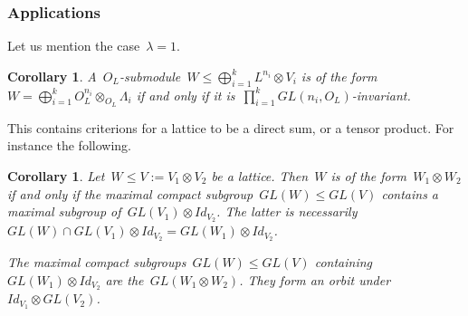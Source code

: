 \documentclass[12pt]{amsart}
\newtheorem{corollary}[theorem]{Corollary}
\newcommand{\tens}{\otimes}
\begin{document}
\subsubsection{Applications}
Let us mention the case~$\lambda=1$. 
\begin{corollary}
A~$O_L$-submodule~$W\leq \bigoplus_{i=1}^k L^{n_i}\tens V_i$ is of the form~$W=\bigoplus_{i=1}^k O_L^{n_i}\tens_{O_L} \Lambda_i$ if and only if it is~$\prod_{i=1}^kGL(n_i,O_{L})$-invariant.
\end{corollary}
This contains criterions for a lattice to be a direct sum, or a tensor product. For instance the following.
\begin{corollary}Let~$W\leq V:= V_1\tens V_2$ be a lattice. Then~$W$ is of the form~$W_1\tens W_2$ if and only if the maximal compact subgroup~$GL(W)\leq GL(V)$ contains a maximal subgroup of~$GL(V_1)\tens Id_{V_2}$. The latter is necessarily~$GL(W)\cap GL(V_1)\tens Id_{V_2}= GL(W_1)\tens Id_{V_2}$.

The maximal compact subgroups~$GL(W)\leq GL(V)$ containing~$GL(W_1)\tens Id_{V_2}$ are the~$GL(W_1\tens W_2)$.
They form an orbit under~$Id_{V_1}\tens GL(V_2)$.
\end{corollary}
\end{document}
